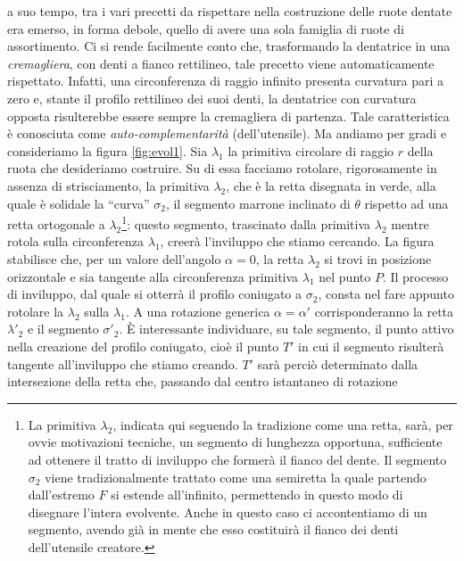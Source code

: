 a suo tempo, tra i vari precetti da rispettare nella costruzione delle ruote
dentate era emerso, in forma debole, quello di avere una sola famiglia
di ruote di assortimento.
Ci si rende facilmente conto che,
trasformando la dentatrice in una 
{\em cremagliera}, con denti a fianco rettilineo,
tale precetto viene automaticamente
rispettato. Infatti, una circonferenza di raggio infinito presenta
curvatura pari a zero e, stante il profilo rettilineo dei suoi denti,
la dentatrice con curvatura opposta risulterebbe essere
sempre la cremagliera di partenza. Tale caratteristica \`e conosciuta
come {\em auto-complementarit\`a}
(dell'utensile).
Ma andiamo per gradi e consideriamo la figura \ref{fig:evol1}.
Sia $\lambda_1$ la primitiva circolare di raggio $r$ della ruota che
desideriamo costruire.
Su di essa facciamo rotolare, rigorosamente in assenza di strisciamento,
la primitiva $\lambda_2$, che \`e la retta disegnata in verde,
alla quale \`e solidale la
``curva'' $\sigma_2$, il segmento marrone inclinato di $\theta$
rispetto ad una retta ortogonale a $\lambda_2$\footnote{
La primitiva $\lambda_2$, indicata qui seguendo la tradizione come una
retta, sar\`a, per ovvie motivazioni tecniche, un segmento di lunghezza opportuna,
sufficiente ad ottenere il tratto di inviluppo che former\`a il fianco
del dente. Il segmento $\sigma_2$ viene tradizionalmente trattato come una
semiretta la quale partendo dall'estremo $F$
si estende all'infinito, permettendo in questo modo di disegnare l'intera
evolvente. Anche in questo caso ci accontentiamo di un segmento, avendo gi\`a in mente
che esso costituir\`a il fianco dei denti dell'utensile creatore.}:
questo segmento, trascinato dalla primitiva $\lambda_2$ mentre
rotola sulla circonferenza $\lambda_1$, 
creer\`a l'inviluppo che stiamo cercando.
La figura stabilisce che, per un valore dell'angolo
 $\alpha =0$, la retta  $\lambda_2$
si trovi in posizione orizzontale e sia tangente alla
 circonferenza primitiva $\lambda_1$ nel
punto $P$.
 Il processo di inviluppo, dal quale si otterr\`a il profilo coniugato
a $\sigma_2$, consta nel fare appunto rotolare la $\lambda_2$ sulla $\lambda_1$.
A una rotazione generica $\alpha=\alpha'$ corrisponderanno
la retta $\lambda'_2$ e il segmento
$\sigma'_2$.
\`E interessante individuare, su tale segmento, il punto
attivo nella creazione del profilo coniugato, cio\`e il punto $T'$
in cui il segmento
risulter\`a tangente all'inviluppo che stiamo creando.
$T'$ sar\`a perci\`o determinato
dalla intersezione della retta che, passando dal centro istantaneo di rotazione

